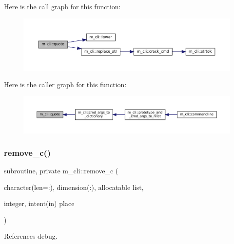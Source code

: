 Here is the call graph for this function\+:\nopagebreak
\begin{figure}[H]
\begin{center}
\leavevmode
\includegraphics[width=350pt]{namespacem__cli_ac82fec2a5441020701fe3c64af3d9948_cgraph}
\end{center}
\end{figure}
Here is the caller graph for this function\+:\nopagebreak
\begin{figure}[H]
\begin{center}
\leavevmode
\includegraphics[width=350pt]{namespacem__cli_ac82fec2a5441020701fe3c64af3d9948_icgraph}
\end{center}
\end{figure}
\mbox{\label{namespacem__cli_a05f549b10f50798d68003b8fd2a2d86a}} 
\subsubsection{\texorpdfstring{remove\+\_\+c()}{remove\_c()}}
{\footnotesize\ttfamily subroutine, private m\+\_\+cli\+::remove\+\_\+c (\begin{DoxyParamCaption}\item[{character(len=\+:), dimension(\+:), allocatable}]{list,  }\item[{integer, intent(in)}]{place }\end{DoxyParamCaption})\hspace{0.3cm}{\ttfamily [private]}}



References debug.

